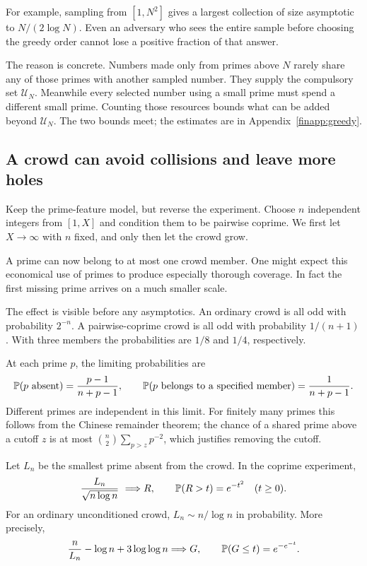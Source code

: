 For example, sampling from $[1,N^2]$ gives a largest collection of
size asymptotic to $N/(2\log N)$.
Even an adversary who sees the entire sample before choosing the
greedy order cannot lose a positive fraction of that answer.

The reason is concrete.  Numbers made only from primes above $N$
rarely share any of those primes with another sampled number.
They supply the compulsory set $\mathcal U_N$.
Meanwhile every selected number using a small prime must spend a
different small prime.  Counting those resources bounds what can be
added beyond $\mathcal U_N$.  The two bounds meet; the estimates are
in Appendix~\ref{finapp:greedy}.

\subsection{A crowd can avoid collisions and leave more holes}
Keep the prime-feature model, but reverse the experiment.
Choose $n$ independent integers from $[1,X]$ and condition them to be
pairwise coprime.  We first let $X\to\infty$ with $n$ fixed, and only
then let the crowd grow.

A prime can now belong to at most one crowd member.  One might expect
this economical use of primes to produce especially thorough coverage.
In fact the first missing prime arrives on a much smaller scale.

The effect is visible before any asymptotics.  An ordinary crowd is all
odd with probability $2^{-n}$.  A pairwise-coprime crowd is all odd
with probability $1/(n+1)$.  With three members the probabilities are
$1/8$ and $1/4$, respectively.

At each prime $p$, the limiting probabilities are
\[
 \mathbb P(p\text{ absent})=\frac{p-1}{n+p-1},\qquad
 \mathbb P(p\text{ belongs to a specified member})=\frac1{n+p-1}.
\]
Different primes are independent in this limit.
For finitely many primes this follows from the Chinese remainder
theorem; the chance of a shared prime above a cutoff $z$ is at most
$\binom n2\sum_{p>z}p^{-2}$, which justifies removing the cutoff.
\begin{proposition}\label{fin:coverage}
Let $L_n$ be the smallest prime absent from the crowd.  In the coprime
experiment,
\[
 \frac{L_n}{\sqrt{n\log n}}\ \Longrightarrow R,
 \qquad \mathbb P(R>t)=e^{-t^2}\quad(t\ge0).
\]
For an ordinary unconditioned crowd, $L_n\sim n/\log n$ in probability.
More precisely,
\[
 \frac n{L_n}-\log n+3\log\log n\Longrightarrow G,
 \qquad \mathbb P(G\le t)=e^{-e^{-t}}.
\]
\end{proposition}

